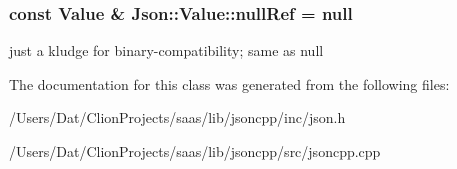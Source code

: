 \subsubsection[{\texorpdfstring{null\+Ref}{nullRef}}]{\setlength{\rightskip}{0pt plus 5cm}const {\bf Value} \& Json\+::\+Value\+::null\+Ref = {\bf null}\hspace{0.3cm}{\ttfamily [static]}}\hypertarget{class_json_1_1_value_aaa4ffd4e53967170c3e8c9abf682b5cd}{}\label{class_json_1_1_value_aaa4ffd4e53967170c3e8c9abf682b5cd}
just a kludge for binary-\/compatibility; same as null 

The documentation for this class was generated from the following files\+:\begin{DoxyCompactItemize}
\item 
/\+Users/\+Dat/\+Clion\+Projects/saas/lib/jsoncpp/inc/json.\+h\item 
/\+Users/\+Dat/\+Clion\+Projects/saas/lib/jsoncpp/src/jsoncpp.\+cpp\end{DoxyCompactItemize}
